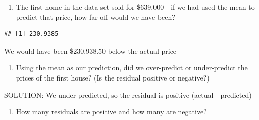 \documentclass[]{article}
\newenvironment{Shaded}{\begin{snugshade}}{\end{snugshade}}
\newcommand{\KeywordTok}[1]{\textcolor[rgb]{0.13,0.29,0.53}{\textbf{#1}}}
\newcommand{\DataTypeTok}[1]{\textcolor[rgb]{0.13,0.29,0.53}{#1}}
\newcommand{\DecValTok}[1]{\textcolor[rgb]{0.00,0.00,0.81}{#1}}
\newcommand{\StringTok}[1]{\textcolor[rgb]{0.31,0.60,0.02}{#1}}
\newcommand{\OperatorTok}[1]{\textcolor[rgb]{0.81,0.36,0.00}{\textbf{#1}}}
\newcommand{\NormalTok}[1]{#1}
\providecommand{\tightlist}{%
  \setlength{\itemsep}{0pt}\setlength{\parskip}{0pt}}
\begin{document}
\begin{enumerate}
\def\labelenumi{\arabic{enumi}.}
\setcounter{enumi}{6}
\tightlist
\item
  The first home in the data set sold for \$639,000 - if we had used the
  mean to predict that price, how far off would we have been?
\end{enumerate}

\begin{Shaded}
\end{Shaded}

\begin{verbatim}
## [1] 230.9385
\end{verbatim}

We would have been \$230,938.50 below the actual price

\begin{enumerate}
\def\labelenumi{\arabic{enumi}.}
\setcounter{enumi}{7}
\tightlist
\item
  Using the mean as our prediction, did we over-predict or under-predict
  the prices of the first house? (Is the residual positive or negative?)
\end{enumerate}

SOLUTION: We under predicted, so the residual is positive (actual -
predicted)

\begin{enumerate}
\def\labelenumi{\arabic{enumi}.}
\setcounter{enumi}{8}
\tightlist
\item
  How many residuals are positive and how many are negative?
\end{enumerate}

\begin{Shaded}
\end{Shaded}
\end{document}
